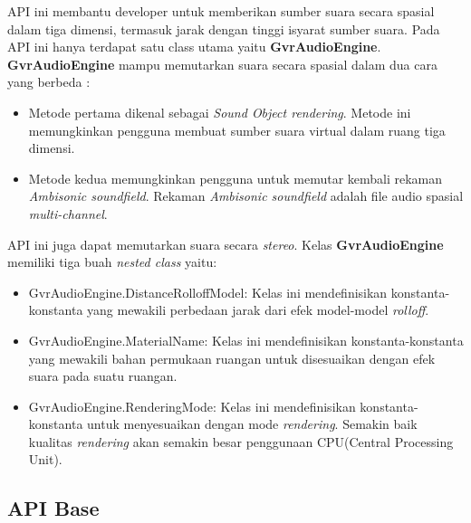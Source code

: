 API ini membantu developer untuk memberikan sumber suara secara spasial dalam tiga dimensi, termasuk jarak dengan tinggi isyarat sumber suara.\cite{google_vr_developers} Pada API ini hanya terdapat satu class utama yaitu \textbf{GvrAudioEngine}. \textbf{GvrAudioEngine} mampu memutarkan suara secara spasial dalam dua cara yang berbeda :
\begin{itemize}
	\item Metode pertama dikenal sebagai \textit{Sound Object rendering}. Metode ini memungkinkan pengguna membuat sumber suara virtual dalam ruang tiga dimensi.
	\item Metode kedua memungkinkan pengguna untuk memutar kembali rekaman \textit{Ambisonic soundfield}. Rekaman \textit{Ambisonic soundfield} adalah file audio spasial \textit{multi-channel}.
\end{itemize}
API ini juga dapat memutarkan suara secara \textit{stereo}. Kelas \textbf{GvrAudioEngine} memiliki tiga buah \textit{nested class} yaitu:
\begin{itemize}
	\item GvrAudioEngine.DistanceRolloffModel: Kelas ini mendefinisikan konstanta-konstanta yang mewakili perbedaan jarak dari efek model-model \textit{rolloff}. 
	\item GvrAudioEngine.MaterialName: Kelas ini mendefinisikan konstanta-konstanta yang mewakili bahan permukaan ruangan untuk disesuaikan dengan efek suara pada suatu ruangan.
	\item GvrAudioEngine.RenderingMode: Kelas ini mendefinisikan konstanta-konstanta untuk menyesuaikan dengan mode \textit{rendering}. Semakin baik kualitas \textit{rendering} akan semakin besar penggunaan CPU(Central Processing Unit).
\end{itemize}

\subsection{API Base}
\label{sec:api_base}

